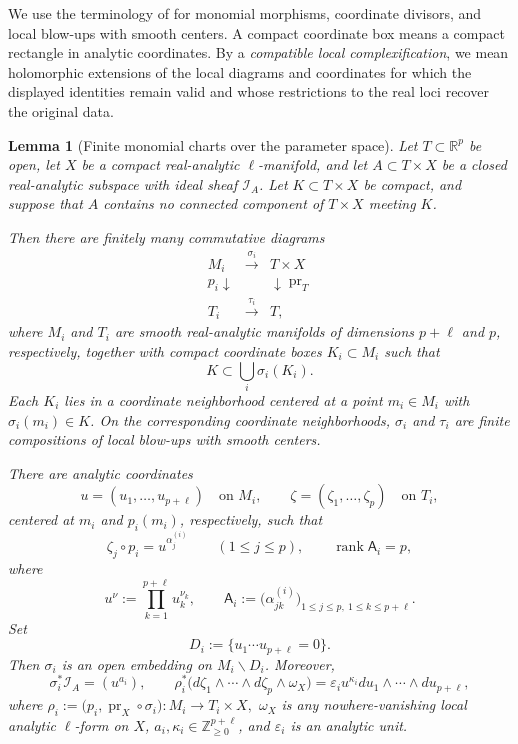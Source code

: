 \documentclass[reqno,11pt]{amsart}
\numberwithin{equation}{section}
\newtheorem{lemma}[theorem]{Lemma}
\theoremstyle{definition}
\theoremstyle{remark}
\begin{document}
We use the terminology of
\cite[Definition~3.2 and Section~9]{Cutkosky2017} for monomial morphisms,
coordinate divisors, and local blow-ups with smooth centers. A compact
coordinate box means a compact rectangle in analytic coordinates. By a
\emph{compatible local complexification}, we mean holomorphic extensions of
the local diagrams and coordinates for which the displayed identities remain
valid and whose restrictions to the real loci recover the original data.

\begin{lemma}[Finite monomial charts over the parameter space]
\label{lem:finite-relative-monomial-charts}
Let $T\subset\mathbb R^p$ be open, let $X$ be a compact real-analytic
$\ell$-manifold, and let $A\subset T\times X$ be a closed real-analytic
subspace with ideal sheaf $\mathcal I_A$. Let $K\subset T\times X$ be
compact, and suppose that $A$ contains no connected component of
$T\times X$ meeting $K$.

Then there are finitely many commutative diagrams
$$
\begin{array}{ccc}
M_i&\xrightarrow{\ \sigma_i\ }&T\times X\\
{\scriptstyle p_i}\downarrow&&
\downarrow{\scriptstyle\operatorname{pr}_T}\\
T_i&\xrightarrow{\ \tau_i\ }&T,
\end{array}
$$
where $M_i$ and $T_i$ are smooth real-analytic manifolds of dimensions
$p+\ell$ and $p$, respectively, together with compact coordinate boxes
$K_i\subset M_i$ such that
$$
K\subset\bigcup_i\sigma_i(K_i).
$$
Each $K_i$ lies in a coordinate neighborhood centered at a point
$m_i\in M_i$ with $\sigma_i(m_i)\in K$. On the corresponding coordinate
neighborhoods, $\sigma_i$ and $\tau_i$ are finite compositions of local
blow-ups with smooth centers.

There are analytic coordinates
$$
u=(u_1,\ldots,u_{p+\ell})
\quad\text{on }M_i,
\qquad
\zeta=(\zeta_1,\ldots,\zeta_p)
\quad\text{on }T_i,
$$
centered at $m_i$ and $p_i(m_i)$, respectively, such that
\begin{equation}\label{eq:relative-monomial-normal-form}
\zeta_j\circ p_i=u^{\alpha_j^{(i)}}
\qquad(1\le j\le p),
\qquad
\operatorname{rank}\mathsf A_i=p,
\end{equation}
where
$$
u^\nu:=\prod_{k=1}^{p+\ell}u_k^{\nu_k},
\qquad
\mathsf A_i
:=
\bigl(\alpha_{jk}^{(i)}\bigr)_{
1\le j\le p,\ 1\le k\le p+\ell}.
$$
Set
$$
D_i:=\{u_1\cdots u_{p+\ell}=0\}.
$$
Then $\sigma_i$ is an open embedding on $M_i\smallsetminus D_i$. Moreover,
\begin{equation}\label{eq:relative-ideal-and-jacobian}
\sigma_i^*\mathcal I_A=(u^{a_i}),
\qquad
\rho_i^*
\bigl(
d\zeta_1\wedge\cdots\wedge d\zeta_p\wedge\omega_X
\bigr)
=
\varepsilon_i u^{\kappa_i}
du_1\wedge\cdots\wedge du_{p+\ell},
\end{equation}
where
$
\rho_i
:=
\bigl(p_i,\operatorname{pr}_X\circ\sigma_i\bigr):
M_i\to T_i\times X,
$
$\omega_X$ is any nowhere-vanishing local analytic $\ell$-form on $X$,
$a_i,\kappa_i\in\mathbb Z_{\ge0}^{p+\ell}$, and $\varepsilon_i$ is an
analytic unit.


\end{lemma}
\end{document}
